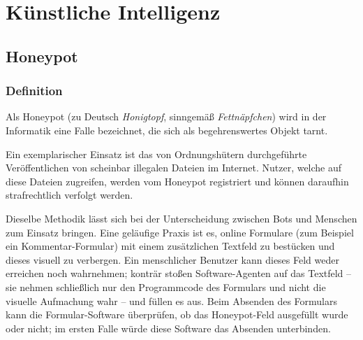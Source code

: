 \section{Künstliche Intelligenz} %
\label{sec:kunstliche_intelligenz}
\subsection{Honeypot} %
\label{sub:honeypot}
\subsubsection{Definition} %
\label{ssub:honeypot_definition}
Als Honeypot (zu Deutsch \emph{Honigtopf}, sinngemäß \emph{Fettnäpfchen}) wird in der Informatik eine Falle bezeichnet, die sich als begehrenswertes Objekt tarnt.

Ein exemplarischer Einsatz ist das von Ordnungshütern durchgeführte Veröffentlichen von scheinbar illegalen Dateien im Internet.
Nutzer, welche auf diese Dateien zugreifen, werden vom Honeypot registriert und können daraufhin strafrechtlich verfolgt werden.

Dieselbe Methodik lässt sich bei der Unterscheidung zwischen Bots und Menschen zum Einsatz bringen.
Eine geläufige Praxis ist es, online Formulare (zum Beispiel ein Kommentar-Formular) mit einem zusätzlichen Textfeld zu bestücken und dieses visuell zu verbergen.
Ein menschlicher Benutzer kann dieses Feld weder erreichen noch wahrnehmen; konträr stoßen Software-Agenten auf das Textfeld – sie nehmen schließlich nur den Programmcode des Formulars und nicht die visuelle Aufmachung wahr – und füllen es aus.
Beim Absenden des Formulars kann die Formular-Software überprüfen, ob das Honeypot-Feld ausgefüllt wurde oder nicht; im ersten Falle würde diese Software das Absenden unterbinden.
